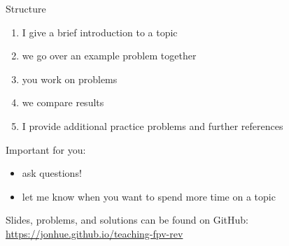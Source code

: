 \documentclass{beamer}
\begin{document}
\begin{frame}{Structure}

\begin{enumerate}
    \item I give a brief introduction to a topic
    \item we go over an example problem together
    \item you work on problems
    \item we compare results
    \item I provide additional practice problems and further references
\end{enumerate}

\vskip 1cm
\pause

Important for you:
\begin{itemize}
    \item ask questions!
    \item let me know when you want to spend more time on a topic
\end{itemize}

\vskip 1cm
\pause

Slides, problems, and solutions can be found on GitHub:
\url{https://jonhue.github.io/teaching-fpv-rev}

\end{frame}
\end{document}
